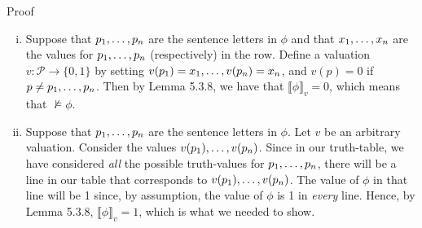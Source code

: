 \begin{frame}{Proof}

\begin{enumerate}[(i)]
		
			\item Suppose that $p_1, \mathellipsis, p_n$ are the sentence letters in $\phi$ and that $x_1, \mathellipsis, x_n$ are the values for $p_1, \mathellipsis, p_n$ (respectively) in the row. Define a valuation $v:\mathcal{P}\to\{0,1\}$ by setting $v(p_1)=x_1, \mathellipsis, v(p_n)=x_n$, and $v(p)=0$ if $p\neq p_1, \mathellipsis, p_n$. Then by Lemma 5.3.8, we have that $\llbracket \phi\rrbracket_v=0$, which means that $\nvDash\phi$.
			
			\item Suppose that $p_1, \mathellipsis, p_n$ are the sentence letters in $\phi$. Let $v$ be an arbitrary valuation. Consider the values $v(p_1), \mathellipsis, v(p_n)$. Since in our truth-table, we have considered \emph{all} the possible truth-values for $p_1, \mathellipsis, p_n$, there will be a line in our table that corresponds to $v(p_1), \mathellipsis, v(p_n)$. The value of $\phi$ in that line will be 1 since, by assumption, the value of $\phi$ is 1 in \emph{every} line. Hence, by  Lemma 5.3.8, $\llbracket \phi\rrbracket_v=1$, which is what we needed to show.


		\end{enumerate}


\end{frame}

